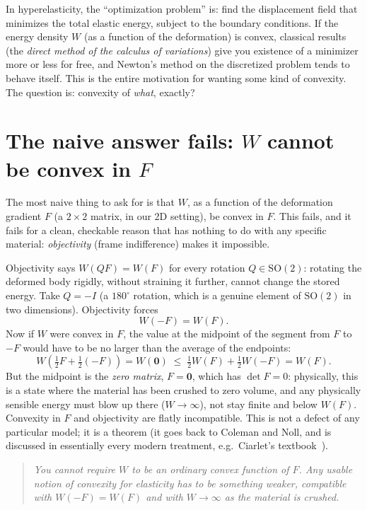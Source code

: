\documentclass[11pt,a4paper]{article}
\newcommand{\SO}{\mathrm{SO}(2)}
\newenvironment{takeaway}
 {\begin{quote}\small\itshape\color{blue!60!black}}
 {\end{quote}}
\begin{document}
In hyperelasticity, the ``optimization problem'' is: find the
displacement field that minimizes the total elastic energy, subject to
the boundary conditions. If the energy density $W$ (as a function of
the deformation) is convex, classical results (the \emph{direct method
of the calculus of variations}) give you existence of a minimizer more
or less for free, and Newton's method on the discretized problem tends
to behave itself. This is the entire motivation for wanting some kind
of convexity. The question is: convexity of \emph{what}, exactly?

\section{The naive answer fails: $W$ cannot be convex in $F$}
\label{sec:naive-fails}

The most naive thing to ask for is that $W$, as a function of the
deformation gradient $F$ (a $2\times2$ matrix, in our 2D setting), be
convex in $F$. This fails, and it fails for a clean, checkable reason
that has nothing to do with any specific material: \emph{objectivity}
(frame indifference) makes it impossible.

Objectivity says $W(QF)=W(F)$ for every rotation $Q\in\SO$: rotating
the deformed body rigidly, without straining it further, cannot change
the stored energy. Take $Q=-I$ (a $180^\circ$ rotation, which is a
genuine element of $\SO$ in two dimensions). Objectivity forces
\[
 W(-F)=W(F).
\]
Now if $W$ were convex in $F$, the value at the midpoint of the segment
from $F$ to $-F$ would have to be no larger than the average of the
endpoints:
\[
 W\!\left(\tfrac12F+\tfrac12(-F)\right) = W(\bm 0) \;\leq\; \tfrac12W(F)+\tfrac12W(-F) = W(F).
\]
But the midpoint is the \emph{zero matrix}, $F=\bm 0$, which has
$\det F=0$: physically, this is a state where the material has been
crushed to zero volume, and any physically sensible energy must blow
up there ($W\to\infty$), not stay finite and below $W(F)$. Convexity in
$F$ and objectivity are flatly incompatible. This is not a defect of
any particular model; it is a theorem (it goes back to Coleman and
Noll, and is discussed in essentially every modern treatment,
e.g.\ Ciarlet's textbook~\cite{Ciarlet1988}).

\begin{takeaway}
You cannot require $W$ to be an ordinary convex function of $F$. Any
usable notion of convexity for elasticity has to be something weaker,
compatible with $W(-F)=W(F)$ and with $W\to\infty$ as the material is
crushed.
\end{takeaway}
\end{document}
